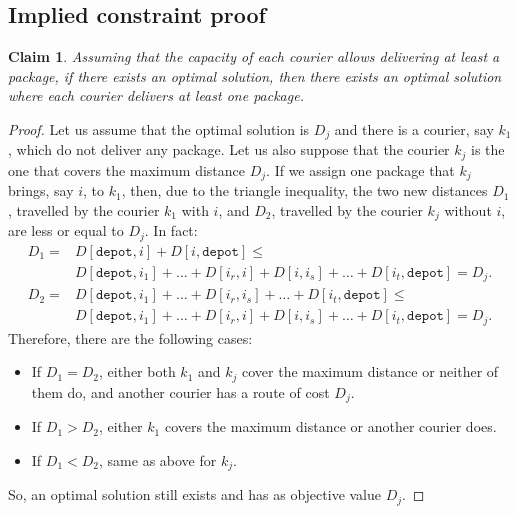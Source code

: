 \documentclass{article}
\newtheorem{lem}{Claim}
\begin{document}
    \begin{appendices}
        \section{Implied constraint proof} \label{sec:impl_proof}
        \begin{lem}
            Assuming that the capacity of each courier allows delivering at least a package, if there exists an optimal solution, then there exists an optimal solution where each courier delivers at least one package.
        \end{lem}
        \begin{proof}
            Let us assume that the optimal solution is $D_j$ and there is a courier, say $k_1$, which do not deliver any package. Let us also suppose that the courier $k_j$ is the one that covers the maximum distance $D_j$. If we assign one package that $k_j$ brings, say $i$, to $k_1$, then, due to the triangle inequality, the two new distances $D_1$, travelled by the courier $k_1$ with $i$, and $D_2$, travelled by the courier $k_j$ without $i$, are less or equal to $D_j$. In fact:
            \begin{equation}
                \begin{split}
                    D_1 = &D[\texttt{depot},i] + D[i,\texttt{depot}] \leq\\
                        & D[\texttt{depot}, i_1] + \dots + D[i_r, i] + D[i, i_s] + \dots + D[i_t, \texttt{depot}] = D_j.
                \end{split}
            \end{equation}
            \begin{equation}
                \begin{split}
                    D_2 = &D[\texttt{depot},i_1] + \dots + D[i_r,i_s] + \dots + D[i_t, \texttt{depot}] \leq\\
                    &D[\texttt{depot}, i_1] + \dots + D[i_r, i] + D[i, i_s] + \dots + D[i_t, \texttt{depot}] = D_j.
                \end{split}
            \end{equation}
            Therefore, there are the following cases:
            \begin{itemize}
                \item If $D_1 = D_2$, either both $k_1$ and $k_j$ cover the maximum distance or neither of them do, and another courier has a route of cost $D_j$.
                \item If $D_1 > D_2$, either $k_1$ covers the maximum distance or another courier does.
                \item If $D_1 < D_2$, same as above for $k_j$.
            \end{itemize}
            So, an optimal solution still exists and has as objective value $D_j$.
        \end{proof}
    \end{appendices}
\end{document}
